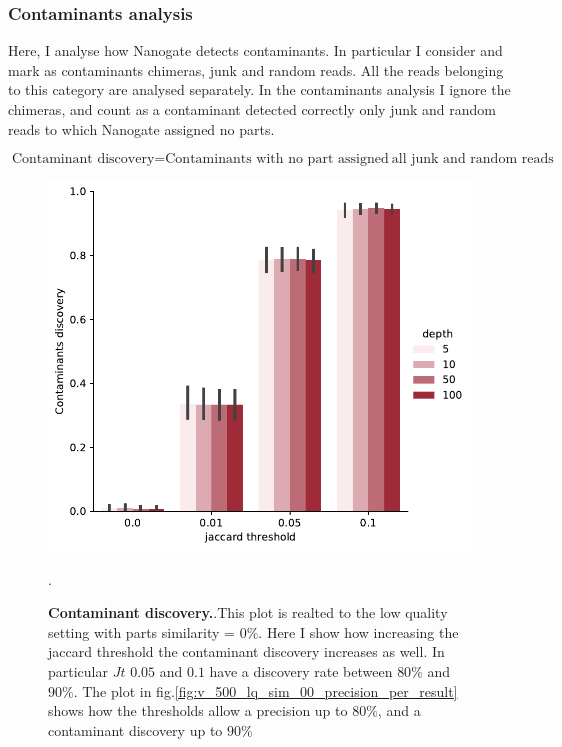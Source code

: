 \documentclass[11pt, a4paper]{article}
\begin{document}
\clearpage
\subsubsection{Contaminants analysis}
Here, I analyse how Nanogate detects contaminants. In particular I consider and mark as contaminants chimeras, junk and random reads. 
All the reads belonging to this category are analysed separately. 
In the contaminants analysis I ignore the chimeras, and count as a contaminant detected correctly only junk and random reads to which Nanogate assigned no parts.

\begin{equation}
    \text{Contaminant discovery} = \text{Contaminants with no part assigned}\ \text{all junk and random reads}
\end{equation}


\begin{figure}[ht]
    \begin{center}
    \includegraphics[width=1.35\textwidth]{../results/images_notebook/v_500/lq_sim_00_contaminant_discovery.pdf}
    \end{center}
    \caption{{\bf Contaminant discovery.}.This plot is realted to the low quality setting with parts similarity = $0\%$. Here I show how increasing the jaccard threshold the contaminant discovery increases as well. In particular $Jt$ $0.05$ and $0.1$ have a discovery rate between $80\%$ and $90\%$.
    The plot in fig.\ref{fig:v_500_lq_sim_00_precision_per_result} shows how the thresholds allow a precision up to $80\%$, and a contaminant discovery up to $90\%$ }
   \label{fig:v_500_contaminant_discovery}.  
\end{figure}



\printbibliography
\end{document}
